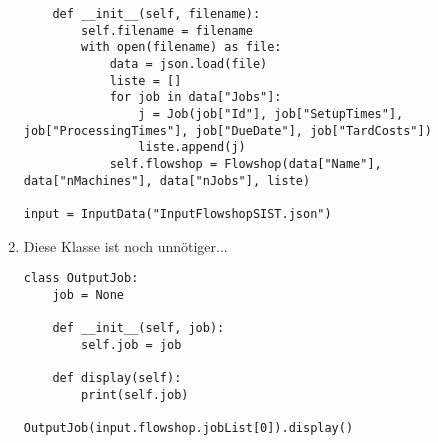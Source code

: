 \documentclass{article}
\begin{document}
\begin{enumerate}[label=(\alph*)]
\begin{lstlisting}
	def __init__(self, filename):
		self.filename = filename
		with open(filename) as file:
			data = json.load(file)
			liste = []
			for job in data["Jobs"]:
				j = Job(job["Id"], job["SetupTimes"], job["ProcessingTimes"], job["DueDate"], job["TardCosts"])
				liste.append(j)
			self.flowshop = Flowshop(data["Name"], data["nMachines"], data["nJobs"], liste)

input = InputData("InputFlowshopSIST.json")
		\end{lstlisting}
		\item Diese Klasse ist noch unnötiger...
		\begin{lstlisting}
class OutputJob:
	job = None

	def __init__(self, job):
		self.job = job

	def display(self):
		print(self.job)

OutputJob(input.flowshop.jobList[0]).display()
		\end{lstlisting}
	\end{enumerate}
\end{document}
